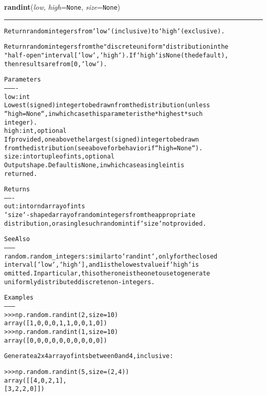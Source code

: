\hspace{.8\funcindent}\begin{boxedminipage}{\funcwidth}

    \raggedright \textbf{randint}(\textit{low}, \textit{high}={\tt None}, \textit{size}={\tt None})

    \vspace{-1.5ex}

    \rule{\textwidth}{0.5\fboxrule}
\setlength{\parskip}{2ex}
\begin{alltt}
Return random integers from `low` (inclusive) to `high` (exclusive).

Return random integers from the "discrete uniform" distribution in the
"half-open" interval [`low`, `high`). If `high` is None (the default),
then results are from [0, `low`).

Parameters
----------
low : int
    Lowest (signed) integer to be drawn from the distribution (unless
    ``high=None``, in which case this parameter is the *highest* such
    integer).
high : int, optional
    If provided, one above the largest (signed) integer to be drawn
    from the distribution (see above for behavior if ``high=None``).
size : int or tuple of ints, optional
    Output shape. Default is None, in which case a single int is
    returned.

Returns
-------
out : int or ndarray of ints
    `size`-shaped array of random integers from the appropriate
    distribution, or a single such random int if `size` not provided.

See Also
--------
random.random\_integers : similar to `randint`, only for the closed
    interval [`low`, `high`], and 1 is the lowest value if `high` is
    omitted. In particular, this other one is the one to use to generate
    uniformly distributed discrete non-integers.

Examples
--------
{\textgreater}{\textgreater}{\textgreater} np.random.randint(2, size=10)
array([1, 0, 0, 0, 1, 1, 0, 0, 1, 0])
{\textgreater}{\textgreater}{\textgreater} np.random.randint(1, size=10)
array([0, 0, 0, 0, 0, 0, 0, 0, 0, 0])

Generate a 2 x 4 array of ints between 0 and 4, inclusive:

{\textgreater}{\textgreater}{\textgreater} np.random.randint(5, size=(2, 4))
array([[4, 0, 2, 1],
       [3, 2, 2, 0]])
\end{alltt}

\setlength{\parskip}{1ex}
    \end{boxedminipage}

